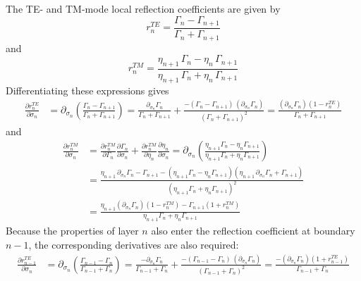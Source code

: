\documentclass[12pt]{report}
\newcommand{\pds}[1]{\partial_{\sigma_{#1}}}   %
\begin{document}
The TE- and TM-mode local reflection coefficients are given by
\begin{equation}
    r_n^{TE} = \frac{\Gamma_n - \Gamma_{n+1}}{\Gamma_n + \Gamma_{n+1}}
    \label{eq:1.11}
\end{equation}
and
\begin{equation}
    r_n^{TM} = \frac{\eta_{n+1}\,\Gamma_n - \eta_n\,\Gamma_{n+1}}
                    {\eta_{n+1}\,\Gamma_n + \eta_n\,\Gamma_{n+1}}
    \label{eq:1.12}
\end{equation}
Differentiating these expressions gives
\begin{align}
    \frac{\partial r_n^{TE}}{\partial \sigma_n}
    &= \pds{n}\!\left(\frac{\Gamma_n - \Gamma_{n+1}}{\Gamma_n + \Gamma_{n+1}}\right)
     = \frac{\pds{n}\Gamma_n}{\Gamma_n + \Gamma_{n+1}}
       + \frac{-(\Gamma_n - \Gamma_{n+1})\,(\pds{n}\Gamma_n)}{(\Gamma_n + \Gamma_{n+1})^2}
     = \frac{(\pds{n}\Gamma_n)(1 - r_n^{TE})}{\Gamma_n + \Gamma_{n+1}}
    \label{eq:1.13}
\end{align}
and
\begin{align}
    \frac{\partial r_n^{TM}}{\partial \sigma_n}
    &= \frac{\partial r_n^{TM}}{\partial \Gamma_n}\frac{\partial \Gamma_n}{\partial \sigma_n}
     + \frac{\partial r_n^{TM}}{\partial \eta_n}\frac{\partial \eta_n}{\partial \sigma_n}
     = \pds{n}\!\left(\frac{\eta_{n+1}\Gamma_n - \eta_n\Gamma_{n+1}}
                          {\eta_{n+1}\Gamma_n + \eta_n\Gamma_{n+1}}\right) \nonumber \\
    &= \frac{\eta_{n+1}\,\pds{n}\Gamma_n - \Gamma_{n+1}
             - (\eta_{n+1}\Gamma_n - \eta_n\Gamma_{n+1})(\eta_{n+1}\,\pds{n}\Gamma_n + \Gamma_{n+1})}
            {(\eta_{n+1}\Gamma_n + \eta_n\Gamma_{n+1})^2} \nonumber \\
    &= \frac{\eta_{n+1}(\pds{n}\Gamma_n)(1 - r_n^{TM}) - \Gamma_{n+1}(1 + r_n^{TM})}
            {\eta_{n+1}\Gamma_n + \eta_n\Gamma_{n+1}}
    \label{eq:1.14}
\end{align}
Because the properties of layer \(n\) also enter the reflection
coefficient at boundary \(n-1\), the corresponding derivatives are also
required:
\begin{align}
    \frac{\partial r_{n-1}^{TE}}{\partial \sigma_n}
    &= \pds{n}\!\left(\frac{\Gamma_{n-1} - \Gamma_n}{\Gamma_{n-1} + \Gamma_n}\right)
     = \frac{-\pds{n}\Gamma_n}{\Gamma_{n-1} + \Gamma_n}
       + \frac{-(\Gamma_{n-1} - \Gamma_n)\,(\pds{n}\Gamma_n)}{(\Gamma_{n-1} + \Gamma_n)^2}
     = \frac{-(\pds{n}\Gamma_n)(1 + r_{n-1}^{TE})}{\Gamma_{n-1} + \Gamma_n}
    \label{eq:1.15}
\end{align}
\end{document}
